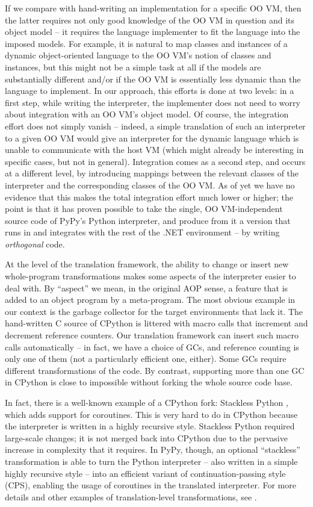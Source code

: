 \documentclass{llncs}
\begin{document}
If we compare with hand-writing an implementation for a specific OO VM,
then the latter requires not only good knowledge of the OO VM in
question and its object model – it requires the language implementer to
fit the language into the imposed models.  For example, it is natural to
map classes and instances of a dynamic object-oriented language to the
OO VM's notion of classes and instances, but this might not be a simple
task at all if the models are substantially different and/or if the OO
VM is essentially less dynamic than the language to implement.  In our
approach, this efforts is done at two levels: in a first step, while
writing the interpreter, the implementer does not need to worry about
integration with an OO VM's object model.  Of course, the integration
effort does not simply vanish – indeed, a simple translation of such an
interpreter to a given OO VM would give an interpreter for the dynamic
language which is unable to communicate with the host VM (which might
already be interesting in specific cases, but not in general).
Integration comes as a second step, and occurs at a different level, by
introducing mappings between the relevant classes of the interpreter and
the corresponding classes of the OO VM.  As of yet we have no evidence
that this makes the total integration effort much lower or higher; the
point is that it has proven possible to take the single, OO
VM-independent source code of PyPy's Python interpreter, and produce
from it a version that runs in and integrates with the rest of the .NET
environment – by writing \emph{orthogonal} code.

At the level of the translation framework, the ability to change or
insert new whole-program transformations makes some aspects of the
interpreter easier to deal with.  By ``aspect'' we mean, in the original
AOP sense, a feature that is added to an object program by a
meta-program.  The most obvious example in our context is the garbage
collector for the target environments that lack it.  The hand-written C
source of CPython is littered with macro calls that increment and
decrement reference counters.  Our translation framework can insert such
macro calls automatically – in fact, we have a choice of GCs, and
reference counting is only one of them (not a particularly efficient
one, either).  Some GCs require different transformations of the code.
By contrast, supporting more than one GC in CPython is close to
impossible without forking the whole source code base.

In fact, there is a well-known example of a CPython fork: Stackless
Python \cite{stackless}, which adds support for coroutines.  This is very hard to
do in CPython because the interpreter is written in a highly recursive
style.  Stackless Python required large-scale changes; it is not merged
back into CPython due to the pervasive increase in complexity that it
requires.  In PyPy, though, an optional ``stackless'' transformation is
able to turn the Python interpreter – also written in a simple highly
recursive style – into an efficient variant of continuation-passing
style (CPS), enabling the usage of coroutines in the translated
interpreter.  For more details and other examples of translation-level
transformations, see \cite{D07.1}.
\end{document}
